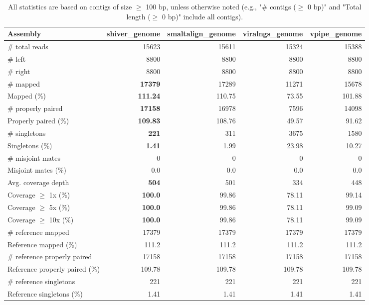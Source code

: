 \documentclass[12pt,a4paper]{article}
\begin{document}
\begin{table}[ht]
\begin{center}
\caption{All statistics are based on contigs of size $\geq$ 100 bp, unless otherwise noted (e.g., "\# contigs ($\geq$ 0 bp)" and "Total length ($\geq$ 0 bp)" include all contigs).}
\begin{tabular}{|l*{4}{|r}|}
\hline
Assembly & shiver\_genome & smaltalign\_genome & viralngs\_genome & vpipe\_genome \\ \hline
\# total reads & 15623 & 15611 & 15324 & 15388 \\ \hline
\# left & 8800 & 8800 & 8800 & 8800 \\ \hline
\# right & 8800 & 8800 & 8800 & 8800 \\ \hline
\# mapped & {\bf 17379} & 17289 & 11271 & 15678 \\ \hline
Mapped (\%) & {\bf 111.24} & 110.75 & 73.55 & 101.88 \\ \hline
\# properly paired & {\bf 17158} & 16978 & 7596 & 14098 \\ \hline
Properly paired (\%) & {\bf 109.83} & 108.76 & 49.57 & 91.62 \\ \hline
\# singletons & {\bf 221} & 311 & 3675 & 1580 \\ \hline
Singletons (\%) & {\bf 1.41} & 1.99 & 23.98 & 10.27 \\ \hline
\# misjoint mates & 0 & 0 & 0 & 0 \\ \hline
Misjoint mates (\%) & 0.0 & 0.0 & 0.0 & 0.0 \\ \hline
Avg. coverage depth & {\bf 504} & 501 & 334 & 448 \\ \hline
Coverage $\geq$ 1x (\%) & {\bf 100.0} & 99.86 & 78.11 & 99.14 \\ \hline
Coverage $\geq$ 5x (\%) & {\bf 100.0} & 99.86 & 78.11 & 99.09 \\ \hline
Coverage $\geq$ 10x (\%) & {\bf 100.0} & 99.86 & 78.11 & 99.09 \\ \hline
\# reference mapped & 17379 & 17379 & 17379 & 17379 \\ \hline
Reference mapped (\%) & 111.2 & 111.2 & 111.2 & 111.2 \\ \hline
\# reference properly paired & 17158 & 17158 & 17158 & 17158 \\ \hline
Reference properly paired (\%) & 109.78 & 109.78 & 109.78 & 109.78 \\ \hline
\# reference singletons & 221 & 221 & 221 & 221 \\ \hline
Reference singletons (\%) & 1.41 & 1.41 & 1.41 & 1.41 \\ \hline

\end{tabular}
\end{center}
\end{table}
\end{document}
